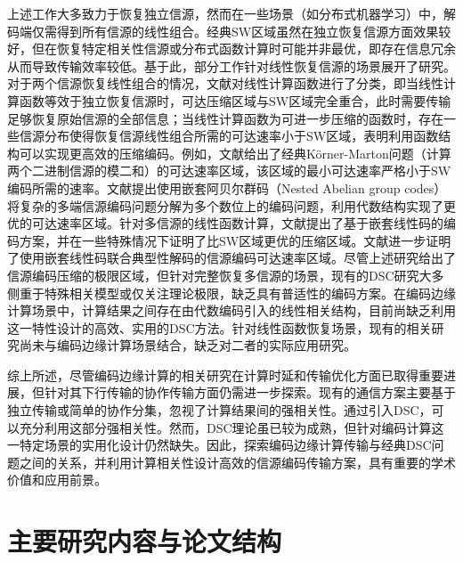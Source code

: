 上述工作大多致力于恢复独立信源，然而在一些场景（如分布式机器学习）中，解码端仅需得到所有信源的线性组合。经典SW区域虽然在独立恢复信源方面效果较好，但在恢复特定相关性信源或分布式函数计算时可能并非最优，即存在信息冗余从而导致传输效率较低。基于此，部分工作针对线性恢复信源的场景展开了研究。对于两个信源恢复线性组合的情况，文献\cite{1057272}对线性计算函数进行了分类，即当线性计算函数等效于独立恢复信源时，可达压缩区域与SW区域完全重合，此时需要传输足够恢复原始信源的全部信息；当线性计算函数为可进一步压缩的函数时，存在一些信源分布使得恢复信源线性组合所需的可达速率小于SW区域，表明利用函数结构可以实现更高效的压缩编码。例如，文献\cite{1056022}给出了经典Körner-Marton问题（计算两个二进制信源的模二和）的可达速率区域，该区域的最小可达速率严格小于SW编码所需的速率。文献\cite{4797745}提出使用嵌套阿贝尔群码（Nested Abelian group codes）将复杂的多端信源编码问题分解为多个数位上的编码问题，利用代数结构实现了更优的可达速率区域。针对多信源的线性函数计算，文献\cite{6481622}提出了基于嵌套线性码的编码方案，并在一些特殊情况下证明了比SW区域更优的压缩区域。文献\cite{lim2019towards}进一步证明了使用嵌套线性码联合典型性解码的信源编码可达速率区域。尽管上述研究给出了信源编码压缩的极限区域，但针对完整恢复多信源的场景，现有的DSC研究大多侧重于特殊相关模型或仅关注理论极限，缺乏具有普适性的编码方案。在编码边缘计算场景中，计算结果之间存在由代数编码引入的线性相关结构，目前尚缺乏利用这一特性设计的高效、实用的DSC方法。针对线性函数恢复场景，现有的相关研究尚未与编码边缘计算场景结合，缺乏对二者的实际应用研究。

综上所述，尽管编码边缘计算的相关研究在计算时延和传输优化方面已取得重要进展，但针对其下行传输的协作传输方面仍需进一步探索。现有的通信方案主要基于独立传输或简单的协作分集，忽视了计算结果间的强相关性。通过引入DSC，可以充分利用这部分强相关性。然而，DSC理论虽已较为成熟，但针对编码计算这一特定场景的实用化设计仍然缺失。因此，探索编码边缘计算传输与经典DSC问题之间的关系，并利用计算相关性设计高效的信源编码传输方案，具有重要的学术价值和应用前景。

\section{主要研究内容与论文结构}

